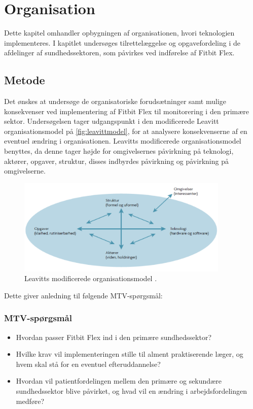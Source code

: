 \chapter{Organisation}
Dette kapitel omhandler opbygningen af organisationen, hvori teknologien implementeres. I kapitlet undersøges tilrettelæggelse og opgavefordeling i de afdelinger af sundhedssektoren, som påvirkes ved indførelse af Fitbit Flex.

\section{Metode}
Det ønskes at undersøge de organisatoriske forudsætninger samt mulige konsekvenser ved implementering af Fitbit Flex til monitorering i den primære sektor. Undersøgelsen tager udgangspunkt i den modificerede Leavitt organisationsmodel på \autoref{fig:leavittmodel}, for at analysere konsekvenserne af en eventuel ændring i organisationen. Leavitts modificerede organisationsmodel benyttes, da denne tager højde for omgivelsernes påvirkning på teknologi, aktører, opgaver, struktur, disses indbyrdes påvirkning og påvirkning på omgivelserne.

\begin{figure}[H]
\centering
\includegraphics[width=0.9\textwidth]{figures/leavitt}
\caption{Leavitts modificerede organisationsmodel \citep{mtvhaandbog}.}
\label{fig:leavittmodel}
\end{figure}
\noindent
Dette giver anledning til følgende MTV-spørgsmål:

\subsection{MTV-spørgsmål}
\begin{itemize}
\item Hvordan passer Fitbit Flex ind i den primære sundhedssektor? 
\item Hvilke krav vil implementeringen stille til alment praktiserende læger, og hvem skal stå for en eventuel efteruddannelse? 
\item  Hvordan vil patientfordelingen mellem den primære og sekundære sundhedssektor blive påvirket, og hvad vil en ændring i arbejdsfordelingen medføre?
\end{itemize}